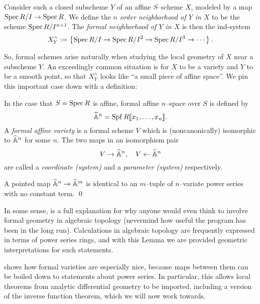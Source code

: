 \begin{definition}
Consider such a closed subscheme $Y$ of an affine $S$--scheme $X$, modeled by a map $\operatorname{Spec} R/I \to \operatorname{Spec} R$.  We define the \textit{$n${\th} order neighborhood of $Y$ in $X$} to be the scheme $\operatorname{Spec} R/I^{n+1}$.  The \textit{formal neighborhood of $Y$ in $X$} is then the ind-system \[X^\wedge_Y := \left\{ \operatorname{Spec} R/I \to \operatorname{Spec} R/I^2 \to \operatorname{Spec} R/I^3 \to \cdots \right\}.\]
\end{definition}

\noindent So, formal schemes arise naturally when studying the local geometry of $X$ near a subscheme $Y$.  An exceedingly common situation is for $X$ to be a variety and $Y$ to be a smooth point, so that $X^\wedge_Y$ looks like ``a small piece of affine space''.  We pin this important case down with a definition:

\begin{definition}
In the case that $S = \operatorname{Spec} R$ is affine, formal affine $n$--space over $S$ is defined by \[\widehat{\mathbb{A}}^n = \operatorname{Spf} R\llbracket x_1, \ldots, x_n\rrbracket.\]  A \textit{formal affine variety} is a formal scheme $V$ which is (noncanonically) isomorphic to $\widehat{\mathbb{A}}^n$ for some $n$.  The two maps in an isomorphism pair \[V \to \widehat{\mathbb{A}}^n, \quad V \leftarrow \widehat{\mathbb{A}}^n\] are called a \textit{coordinate (system)} and a \textit{parameter (system)} respectively.
\end{definition}

\begin{lemma}\label{MapsOfFVarsArePowerSeries}
A pointed map $\widehat{\mathbb{A}}^n \to \widehat{\mathbb{A}}^m$ is identical to an $m$--tuple of $n$--variate power series with no constant term. \qed
\end{lemma}

\begin{remark}
In some sense,  is a full explanation for why anyone would even think to involve formal geometry in algebraic topology (nevermind how useful the program has been in the long run).  Calculations in algebraic topology are frequently expressed in terms of power series rings, and with this Lemma we are provided geometric interpretations for such statements.
\end{remark}

 shows how formal varieties are especially nice, because maps between them can be boiled down to statements about power series.  In particular, this allows local theorems from analytic differential geometry to be imported, including a version of the inverse function theorem, which we will now work towards.

